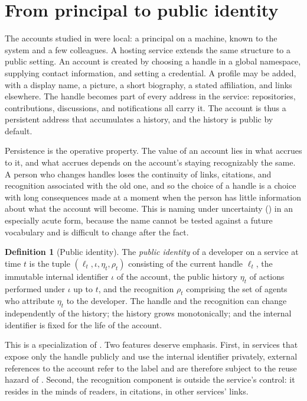 \documentclass[11pt,twoside,openright]{book}
\theoremstyle{plain}
\theoremstyle{definition}
\newtheorem{definition}[theorem]{Definition}
\theoremstyle{remark}
\begin{document}
\section{From principal to public identity}

The accounts studied in  were local: a principal on a machine, known to the system and a few colleagues. A hosting service extends the same structure to a public setting. An account is created by choosing a handle in a global namespace, supplying contact information, and setting a credential. A profile may be added, with a display name, a picture, a short biography, a stated affiliation, and links elsewhere. The handle becomes part of every address in the service: repositories, contributions, discussions, and notifications all carry it. The account is thus a persistent address that accumulates a history, and the history is public by default.

Persistence is the operative property. The value of an account lies in what accrues to it, and what accrues depends on the account's staying recognizably the same. A person who changes handles loses the continuity of links, citations, and recognition associated with the old one, and so the choice of a handle is a choice with long consequences made at a moment when the person has little information about what the account will become. This is naming under uncertainty () in an especially acute form, because the name cannot be tested against a future vocabulary and is difficult to change after the fact.

\begin{definition}[Public identity]\label{def:publicid}
The \emph{public identity} of a developer on a service at time $t$ is the tuple $(\ell_t,\iota,\eta_t,\rho_t)$ consisting of the current handle $\ell_t$, the immutable internal identifier $\iota$ of the account, the public history $\eta_t$ of actions performed under $\iota$ up to $t$, and the recognition $\rho_t$ comprising the set of agents who attribute $\eta_t$ to the developer. The handle and the recognition can change independently of the history; the history grows monotonically; and the internal identifier is fixed for the life of the account.
\end{definition}

This is a specialization of . Two features deserve emphasis. First, in services that expose only the handle publicly and use the internal identifier privately, external references to the account refer to the label and are therefore subject to the reuse hazard of . Second, the recognition component is outside the service's control: it resides in the minds of readers, in citations, in other services' links.
\end{document}
